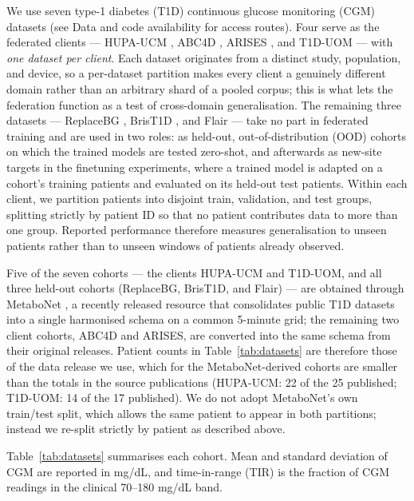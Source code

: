 \documentclass[10pt,letterpaper]{article}
\begin{document}
We use seven type-1 diabetes (T1D) continuous glucose
monitoring (CGM) datasets (see Data and code availability for access routes). Four serve as the federated clients --- HUPA-UCM
\cite{hidalgo2024hupaucm}, ABC4D \cite{abc4d_nct}, ARISES \cite{zhu2022arises},
and T1D-UOM \cite{alsuhaymi2025t1duom} --- with \emph{one dataset per client}. Each dataset
originates from a distinct study, population, and device, so a per-dataset
partition makes every client a genuinely different domain rather than an
arbitrary shard of a pooled corpus; this is what lets the federation function as
a test of cross-domain generalisation. The remaining three datasets ---
ReplaceBG \cite{aleppo2017replacebg}, BrisT1D \cite{james2025brist1d}, and Flair
\cite{jaeb_flair} --- take no part in federated training and are used in two
roles: as held-out, out-of-distribution (OOD) cohorts on which the trained
models are tested zero-shot, and afterwards as new-site targets in the
finetuning experiments, where a trained model is adapted on a cohort's
training patients and evaluated on its held-out test patients. Within
each client, we partition patients
into disjoint train, validation, and test groups, splitting strictly by
patient ID so that no patient contributes data to more than one group. Reported performance therefore measures generalisation to
unseen patients rather than to unseen windows of patients already observed.

Five of the seven cohorts --- the clients HUPA-UCM and T1D-UOM, and all three
held-out cohorts (ReplaceBG, BrisT1D, and Flair) --- are obtained through
MetaboNet \cite{wolff2026metabonet}, a
recently released resource that consolidates public T1D datasets into a single
harmonised schema on a common 5-minute grid; the remaining two client cohorts,
ABC4D and ARISES, are converted
into the same schema from their original releases. Patient counts in
Table~\ref{tab:datasets} are therefore those of the data release we use, which
for the MetaboNet-derived cohorts are smaller than the totals in the source
publications (HUPA-UCM: 22 of the 25 published; T1D-UOM: 14 of the 17
published). We do not adopt MetaboNet's own train/test split, which allows the
same patient to appear in both partitions; instead we re-split strictly by
patient as described above.

Table~\ref{tab:datasets} summarises each cohort. Mean and standard deviation of
CGM are reported in mg/dL, and time-in-range (TIR) is the fraction of CGM
readings in the clinical 70--180 mg/dL band.
\end{document}

